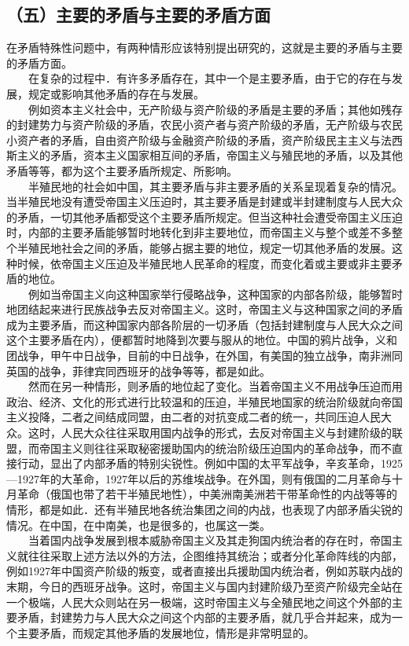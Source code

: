 \documentclass[cn,11pt,chinese]{elegantbook}
\def\myformat#1{\hfil\hfil #1}
\begin{document}
\subsection*{\myformat{（五）主要的矛盾与主要的矛盾方面}}
在矛盾特殊性问题中，有两种情形应该特别提出研究的，这就是主要的矛盾与主要的矛盾方面。\\
　　在复杂的过程中．有许多矛盾存在，其中一个是主要矛盾，由于它的存在与发展，规定或影响其他矛盾的存在与发展。\\
　　例如资本主义社会中，无产阶级与资产阶级的矛盾是主要的矛盾；其他如残存的封建势力与资产阶级的矛盾，农民小资产者与资产阶级的矛盾，无产阶级与农民小资产者的矛盾，自由资产阶级与金融资产阶级的矛盾，资产阶级民主主义与法西斯主义的矛盾，资本主义国家相互间的矛盾，帝国主义与殖民地的矛盾，以及其他矛盾等等，都为这个主要矛盾所规定、所影响。\\
　　半殖民地的社会如中国，其主要矛盾与非主要矛盾的关系呈现着复杂的情况。当半殖民地没有遭受帝国主义压迫时，其主要矛盾是封建或半封建制度与人民大众的矛盾，一切其他矛盾都受这个主要矛盾所规定。但当这种社会遭受帝国主义压迫时，内部的主要矛盾能够暂时地转化到非主要地位，而帝国主义与整个或差不多整个半殖民地社会之间的矛盾，能够占据主要的地位，规定一切其他矛盾的发展。这种时候，依帝国主义压迫及半殖民地人民革命的程度，而变化着或主要或非主要矛盾的地位。\\
　　例如当帝国主义向这种国家举行侵略战争，这种国家的内部各阶级，能够暂时地团结起来进行民族战争去反对帝国主义。这时，帝国主义与这种国家之间的矛盾成为主要矛盾，而这种国家内部各阶层的一切矛盾（包括封建制度与人民大众之间这个主要矛盾在内），便都暂时地降到次要与服从的地位。中国的鸦片战争，义和团战争，甲午中日战争，目前的中日战争，在外国，有美国的独立战争，南非洲同英国的战争，菲律宾同西班牙的战争等等，都是如此。\\
　　然而在另一种情形，则矛盾的地位起了变化。当着帝国主义不用战争压迫而用政治、经济、文化的形式进行比较温和的压迫，半殖民地国家的统治阶级就向帝国主义投降，二者之间结成同盟，由二者的对抗变成二者的统一，共同压迫人民大众。这时，人民大众往往采取用国内战争的形式，去反对帝国主义与封建阶级的联盟，而帝国主义则往往采取秘密援助国内的统治阶级压迫国内的革命战争，而不直接行动，显出了内部矛盾的特别尖锐性。例如中国的太平军战争，辛亥革命，1925—1927年的大革命，1927年以后的苏维埃战争。在外国，则有俄国的二月革命与十月革命（俄国也带了若干半殖民地性），中美洲南美洲若干带革命性的内战等等的情形，都是如此．还有半殖民地各统治集团之间的内战，也表现了内部矛盾尖锐的情况。在中国，在中南美，也是很多的，也属这一类。\\
　　当着国内战争发展到根本威胁帝国主义及其走狗国内统治者的存在时，帝国主义就往往采取上述方法以外的方法，企图维持其统治；或者分化革命阵线的内部，例如1927年中国资产阶级的叛变，或者直接出兵援助国内统治者，例如苏联内战的末期，今日的西班牙战争。这时，帝国主义与国内封建阶级乃至资产阶级完全站在一个极端，人民大众则站在另一极端，这时帝国主义与全殖民地之间这个外部的主要矛盾，封建势力与人民大众之间这个内部的主要矛盾，就几乎合并起来，成为一个主要矛盾，而规定其他矛盾的发展地位，情形是非常明显的。\\
\end{document}
